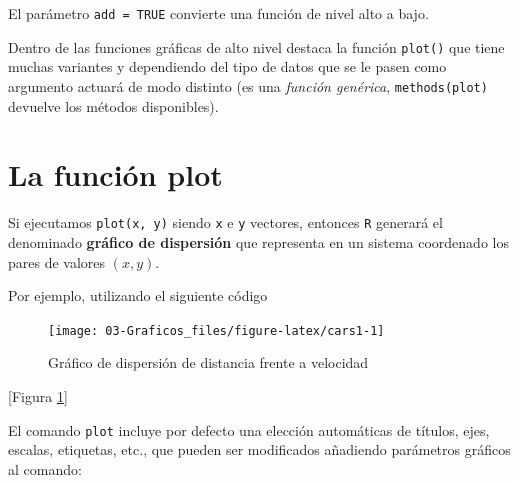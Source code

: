\documentclass[
]{book}
\newenvironment{Shaded}{\begin{snugshade}}{\end{snugshade}}
\newcommand{\CommentTok}[1]{\textcolor[rgb]{0.56,0.35,0.01}{\textit{#1}}}
\newcommand{\FunctionTok}[1]{\textcolor[rgb]{0.00,0.00,0.00}{#1}}
\newcommand{\NormalTok}[1]{#1}
\newcommand{\SpecialCharTok}[1]{\textcolor[rgb]{0.00,0.00,0.00}{#1}}
\theoremstyle{break}
\theoremstyle{nonumberplain}
\begin{document}
El parámetro \texttt{add\ =\ TRUE} convierte una función de nivel alto a bajo.

Dentro de las funciones gráficas de alto nivel destaca la función \texttt{plot()} que tiene muchas variantes y dependiendo del tipo de datos que se le pasen como argumento actuará de modo distinto
(es una \emph{función genérica}, \texttt{methods(plot)} devuelve los métodos disponibles).

\hypertarget{funcion-plot}{%
\section{La función plot}\label{funcion-plot}}

Si ejecutamos \texttt{plot(x,\ y)} siendo \texttt{x} e \texttt{y} vectores, entonces \texttt{R} generará el denominado \textbf{gráfico de dispersión} que
representa en un sistema coordenado los pares de valores \((x,y)\).

Por ejemplo, utilizando el siguiente código

\begin{Shaded}
\end{Shaded}

\begin{figure}[!htb]

{\centering \texttt{[image: 03-Graficos\_files/figure-latex/cars1-1]} 

}

\caption{Gráfico de dispersión de distancia frente a velocidad}\label{fig:cars1}
\end{figure}

{[}Figura \ref{fig:cars1}{]}

El comando \texttt{plot} incluye por defecto una elección automáticas de
títulos, ejes, escalas, etiquetas, etc., que pueden ser modificados
añadiendo parámetros gráficos al comando:
\end{document}
